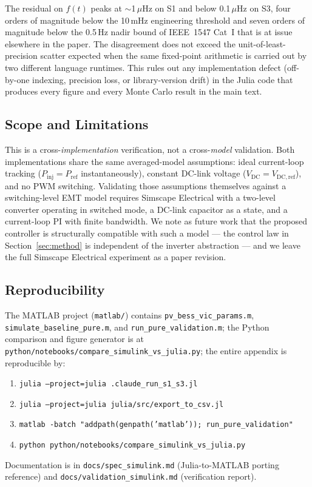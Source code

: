 The residual on $f(t)$ peaks at $\sim$1\,$\mu$Hz on S1 and below
0.1\,$\mu$Hz on S3, four orders of magnitude below the 10\,mHz
engineering threshold and seven orders of magnitude below the 0.5\,Hz
nadir bound of IEEE~1547 Cat~I that is at issue elsewhere in the
paper. The disagreement does not exceed the unit-of-least-precision
scatter expected when the same fixed-point arithmetic is carried out
by two different language runtimes. This rules out any implementation
defect (off-by-one indexing, precision loss, or library-version drift)
in the Julia code that produces every figure and every Monte Carlo
result in the main text.

\subsection{Scope and Limitations}
This is a cross-\emph{implementation} verification, not a
cross-\emph{model} validation. Both implementations share the same
averaged-model assumptions: ideal current-loop tracking
($P_\mathrm{inj}=P_\mathrm{ref}$ instantaneously), constant DC-link
voltage ($V_\mathrm{DC}=V_\mathrm{DC,ref}$), and no PWM switching.
Validating those assumptions themselves against a switching-level EMT
model requires Simscape Electrical with a two-level converter operating
in switched mode, a DC-link capacitor as a state, and a current-loop PI
with finite bandwidth. We note as future work that the proposed
controller is structurally compatible with such a model — the control
law in Section~\ref{sec:method} is independent of the inverter
abstraction — and we leave the full Simscape Electrical experiment as
a paper revision.

\subsection{Reproducibility}
The MATLAB project (\texttt{matlab/}) contains
\texttt{pv\_bess\_vic\_params.m},
\texttt{simulate\_baseline\_pure.m}, and
\texttt{run\_pure\_validation.m}; the Python comparison and figure
generator is at
\texttt{python/notebooks/compare\_simulink\_vs\_julia.py}; the entire
appendix is reproducible by:
\begin{enumerate}\itemsep0pt
  \item \texttt{julia --project=julia .claude\_run\_s1\_s3.jl}
  \item \texttt{julia --project=julia julia/src/export\_to\_csv.jl}
  \item \texttt{matlab -batch "addpath(genpath('matlab')); run\_pure\_validation"}
  \item \texttt{python python/notebooks/compare\_simulink\_vs\_julia.py}
\end{enumerate}
Documentation is in \texttt{docs/spec\_simulink.md} (Julia-to-MATLAB
porting reference) and \texttt{docs/validation\_simulink.md}
(verification report).
